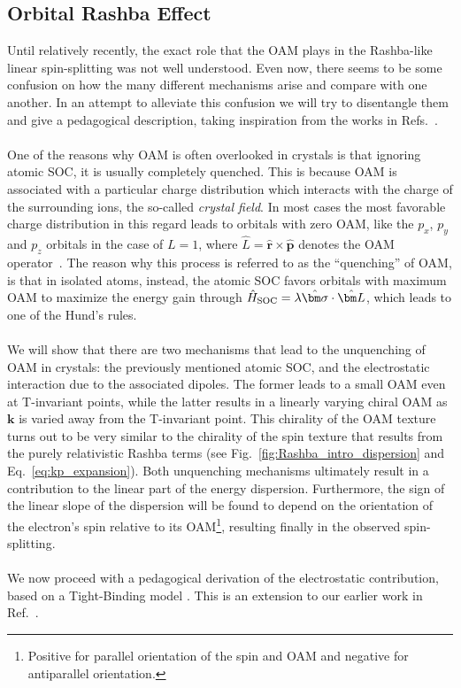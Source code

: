 \subsection{Orbital Rashba Effect}
Until relatively recently, the exact role that the OAM plays in the Rashba-like linear spin-splitting was not well understood. Even now, there seems to be some confusion on how the many different mechanisms arise and compare with one another.   
In an attempt to alleviate this confusion we will try to disentangle them and give a pedagogical description, taking inspiration from the works in Refs.~\cite{Petersen2000,Park2011,Park2012,Kim2014,Park2015,Go2016}.
\\\\
One of the reasons why OAM is often overlooked in crystals is that ignoring atomic SOC, it is usually completely quenched.
This is because OAM is associated with a particular charge distribution which interacts with the charge of the surrounding ions, the so-called {\it crystal field}.
In most cases the most favorable charge distribution in this regard leads to orbitals with zero OAM, like the $p_x$, $p_y$ and $p_z$ orbitals in the case of $L=1$, where $\hat{L} = \hat{\bm r} \times \hat{\bm p}$ denotes the OAM operator~\cite{Ballhausen}.
The reason why this process is referred to as the ``quenching'' of OAM, is that in isolated atoms, instead, the atomic SOC favors orbitals with maximum OAM to maximize the energy gain through $\hat{H}_{\rm SOC} = \lambda \hat{\bm \sigma} \cdot \hat{\bm L}$, which leads to one of the Hund's rules.
\\\\
We will show that there are two mechanisms that lead to the unquenching of OAM in crystals: the previously mentioned atomic SOC, and the electrostatic interaction due to the associated dipoles.
The former leads to a small OAM even at T-invariant points, while the latter results in a linearly varying chiral OAM as $\bm k$ is varied away from the T-invariant point.
This chirality of the OAM texture turns out to be very similar to the chirality of the spin texture that results from the purely relativistic Rashba terms (see Fig.~\ref{fig:Rashba_intro_dispersion} and Eq.~\eqref{eq:kp_expansion}).
Both unquenching mechanisms ultimately result in a contribution to the linear part of the energy dispersion.
Furthermore, the sign of the linear slope of the dispersion will be found to depend on the orientation of the electron's spin relative to its OAM\footnote{Positive for parallel orientation of the spin and OAM and negative for antiparallel orientation.}, resulting finally in the observed spin-splitting.
\\\\
We now proceed with a pedagogical derivation of the electrostatic contribution, based on a Tight-Binding model \cite{Bloch1929,Slater1954,Petersen2000,Kim2014,Go2016}. This is an extension to our earlier work in Ref.~\cite{Ponet2018}.

